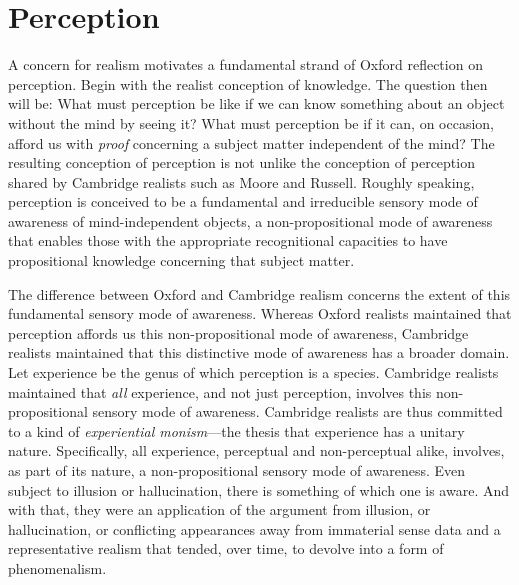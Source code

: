\documentclass[11pt]{article}
\title{\mytitle}
\author{\myauthor}
\begin{document}
\maketitle

\setlength{\parindent}{1em}


% 
% 
% 

\section{Perception} %
\label{sec:perception}

A concern for realism motivates a fundamental strand of Oxford reflection on perception. Begin with the realist conception of knowledge.  The question then will be: What must perception be like if we can know something about an object without the mind by seeing it? What must perception be if it can, on occasion, afford us with \emph{proof} concerning a subject matter independent of the mind? The resulting conception of perception is not unlike the conception of perception shared by Cambridge realists such as Moore and Russell. Roughly speaking, perception is conceived to be a fundamental and irreducible sensory mode of awareness of mind-independent objects, a non-propositional mode of awareness that enables those with the appropriate recognitional capacities to have propositional knowledge concerning that subject matter. 

The difference between Oxford and Cambridge realism concerns the extent of this fundamental sensory mode of awareness. Whereas Oxford realists maintained that perception affords us this non-propositional mode of awareness, Cambridge realists maintained that this distinctive mode of awareness has a broader domain. Let experience be the genus of which perception is a species. Cambridge realists maintained that \emph{all} experience, and not just perception, involves this non-propositional sensory mode of awareness. Cambridge realists are thus committed to a kind of \emph{experiential monism}---the thesis that experience has a unitary nature. Specifically, all experience, perceptual and non-perceptual alike, involves, as part of its nature, a non-propositional sensory mode of awareness. Even subject to illusion or hallucination, there is something of which one is aware. And with that, they were an application of the argument from illusion, or hallucination, or conflicting appearances away from immaterial sense data and a representative realism that tended, over time, to devolve into a form of phenomenalism.
\end{document}
